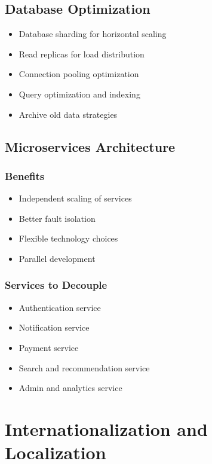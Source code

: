 \subsection{Database Optimization}

\begin{itemize}
    \item Database sharding for horizontal scaling
    \item Read replicas for load distribution
    \item Connection pooling optimization
    \item Query optimization and indexing
    \item Archive old data strategies
\end{itemize}

\subsection{Microservices Architecture}

\subsubsection{Benefits}
\begin{itemize}
    \item Independent scaling of services
    \item Better fault isolation
    \item Flexible technology choices
    \item Parallel development
\end{itemize}

\subsubsection{Services to Decouple}
\begin{itemize}
    \item Authentication service
    \item Notification service
    \item Payment service
    \item Search and recommendation service
    \item Admin and analytics service
\end{itemize}

\section{Internationalization and Localization}


